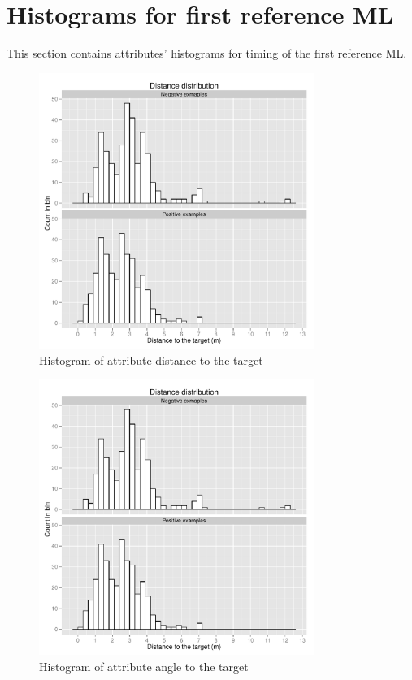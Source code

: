 \section{Histograms for first reference ML}
This section contains attributes' histograms for timing of the first reference ML.
\begin{figure}[!htbp]
  \centering
	\includegraphics[page=1,width=0.8\textwidth]{Images/fref_distrib}
	\caption{Histogram of attribute distance to the target}
	\label{fig:fref-distrib-dist}
\end{figure}

\begin{figure}[!htbp]
  \centering
	\includegraphics[page=2,width=0.8\textwidth]{Images/fref_distrib}
	\caption{Histogram of attribute angle to the target}
	\label{fig:fref-distrib-angle}
\end{figure}

